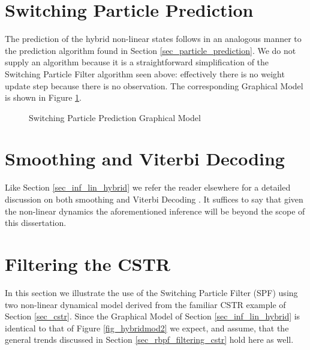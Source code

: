 \section{Switching Particle Prediction}
The prediction of the hybrid non-linear states follows in an analogous manner to the prediction algorithm found in Section \ref{sec_particle_prediction}. We do not supply an algorithm because it is a straightforward simplification of the Switching Particle Filter algorithm seen above: effectively there is no weight update step because there is no observation. The corresponding Graphical Model is shown in Figure \ref{fig_hybridmod2_prediction}.
\begin{figure}[H] 
\centering
{}
\caption{Switching Particle Prediction Graphical Model}
\label{fig_hybridmod2_prediction}
\end{figure}  

\section{Smoothing and Viterbi Decoding}
Like Section \ref{sec_inf_lin_hybrid} we refer the reader elsewhere for a detailed discussion on both smoothing and Viterbi Decoding \cite{murphy1}. It suffices to say that given the non-linear dynamics the aforementioned inference will be beyond the scope of this dissertation. 

\section{Filtering the CSTR}
\label{sec_spf_filtering}
In this section we illustrate the use of the Switching Particle Filter (SPF) using  two non-linear dynamical model derived from the familiar CSTR example of Section \ref{sec_cstr}. Since the Graphical Model of Section \ref{sec_inf_lin_hybrid} is identical to that of Figure \ref{fig_hybridmod2} we expect, and assume, that the general trends discussed in Section \ref{sec_rbpf_filtering_cstr} hold here as well.

